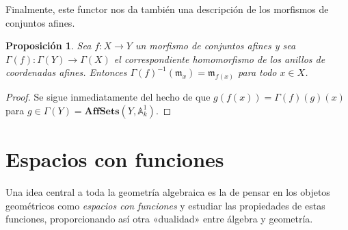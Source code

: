 \documentclass[12pt,a4paper]{article}
\newtheorem{prop}[thm]{Proposición}
\theoremstyle{definition} \newtheorem{defn}[thm]{Definición}
\theoremstyle{definition} \newtheorem{ejemplo}[thm]{Ejemplo}
\theoremstyle{definition} \newtheorem{ejercicio}[thm]{Ejercicio}
\theoremstyle{remark} \newtheorem*{obs}{Observación}
\def\AA{\mathbb{A}}
\def\mm{\mathfrak{m}}
\begin{document}
      Finalmente, este functor nos da también una descripción de los morfismos de conjuntos afines.
      \begin{prop}
	Sea $f:X\rightarrow Y$ un morfismo de conjuntos afines y sea $\Gamma(f):\Gamma(Y)\rightarrow \Gamma(X)$ el correspondiente homomorfismo de los anillos de coordenadas afines. Entonces $\Gamma(f)^{-1}(\mm_x)=\mm_{f(x)}$ para todo $x\in X$.
      \end{prop}
      \begin{proof}
	Se sigue inmediatamente del hecho de que $g(f(x))=\Gamma(f)(g)(x)$ para $g\in \Gamma(Y)=\mathbf{AffSets}(Y,\AA^1_k)$.
      \end{proof}

      \section{Espacios con funciones}
      Una idea central a toda la geometría algebraica es la de pensar en los objetos geométricos como \emph{espacios con funciones} y estudiar las propiedades de estas funciones, proporcionando así otra «dualidad» entre álgebra y geometría. 
\end{document}
